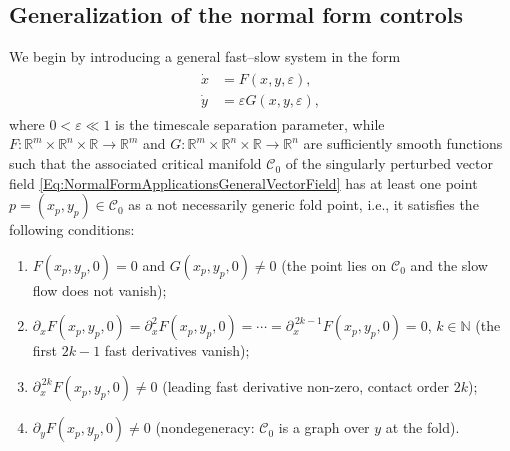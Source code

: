 \documentclass[3p]{elsarticle}
\theoremstyle{plain}
\theoremstyle{remark}
\theoremstyle{definition}
\begin{document}
    \subsection{Generalization of the normal form controls}
    \label{Sec:Applications}
    We begin by introducing a general fast--slow system in the form
    \begin{align}
        \begin{split}
            \dot{x} &= F(x,y, \varepsilon),\\
            \dot{y} &= \varepsilon G(x,y, \varepsilon),
            \label{Eq:NormalFormApplicationsGeneralVectorField}
        \end{split}
    \end{align}
    where $0<\varepsilon\ll1$ is the timescale separation parameter, while $F:\mathbb{R}^{m}\times\mathbb{R}^{n}\times\mathbb{R}\xrightarrow{}\mathbb{R}^{m}$ and $G:\mathbb{R}^{m}\times\mathbb{R}^{n}\times\mathbb{R}\xrightarrow{}\mathbb{R}^{n}$ are sufficiently smooth functions such that the associated critical manifold $\mathcal{C}_{0}$ of the singularly perturbed vector field \eqref{Eq:NormalFormApplicationsGeneralVectorField} has at least one point $p=\left( x_{p}, y_{p}
  \right)\in\mathcal{C}_{0}$ as a not necessarily generic fold point, i.e., it satisfies the following conditions: 
\begin{enumerate}
  \item[(i)] $F(x_p,y_p,0)=0$ and $G(x_p,y_p,0)\neq 0$
        \quad(the point lies on $\mathcal C_0$ and the slow flow does not vanish);
  \item[(ii)] $\partial_x F(x_p,y_p,0)=\partial_x^2 F(x_p,y_p,0)=\cdots
        =\partial_x^{\,2k-1} F(x_p,y_p,0)=0$, $k\in\mathbb N$
        \quad(the first $2k-1$ fast derivatives vanish);
  \item[(iii)] $\partial_x^{\,2k} F(x_p,y_p,0)\neq 0$
        \quad(leading fast derivative non-zero, contact order $2k$);
  \item[(iv)] $\partial_y F(x_p,y_p,0)\neq 0$
        \quad(nondegeneracy: $\mathcal C_0$ is a graph over $y$ at the fold).
\end{enumerate}
 
\end{document}
